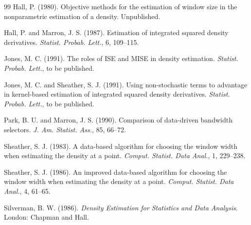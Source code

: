 \documentclass[11pt]{article}
\begin{document}
\begin{thebibliography}{99}
Hall, P. (1980). Objective methods for the estimation of window size in the nonparametric estimation of a density. Unpublished.

Hall, P. and Marron, J. S. (1987). Estimation of integrated squared density derivatives. \emph{Statist. Probab. Lett.}, 6, 109--115.

Jones, M. C. (1991). The roles of ISE and MISE in density estimation. \emph{Statist. Probab. Lett.}, to be published.

Jones, M. C. and Sheather, S. J. (1991). Using non-stochastic terms to advantage in kernel-based estimation of integrated squared density derivatives. \emph{Statist. Probab. Lett.}, to be published.

Park, B. U. and Marron, J. S. (1990). Comparison of data-driven bandwidth selectors. \emph{J. Am. Statist. Ass.}, 85, 66--72.

Sheather, S. J. (1983). A data-based algorithm for choosing the window width when estimating the density at a point. \emph{Comput. Statist. Data Anal.}, 1, 229--238.

Sheather, S. J. (1986). An improved data-based algorithm for choosing the window width when estimating the density at a point. \emph{Comput. Statist. Data Anal.}, 4, 61--65.

Silverman, B. W. (1986). \emph{Density Estimation for Statistics and Data Analysis}. London: Chapman and Hall.

\end{thebibliography}
\end{document}
